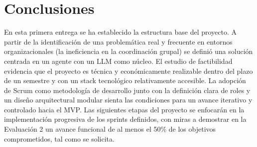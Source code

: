 \section{Conclusiones}

En esta primera entrega se ha establecido la estructura base del proyecto. A partir de la identificación de una problemática real y frecuente en entornos organizacionales (la ineficiencia en la coordinación grupal) se definió una solución centrada en un agente con un LLM como núcleo. El estudio de factibilidad evidencia que el proyecto es técnica y económicamente realizable dentro del plazo de un semestre y con un stack tecnológico relativamente accesible. La adopción de Scrum como metodología de desarrollo junto con la definición clara de roles y un diseño arquitectural modular sienta las condiciones para un avance iterativo y controlado hacia el MVP. Las siguientes etapas del proyecto se enfocarán en la implementación progresiva de los sprints definidos, con miras a demostrar en la Evaluación 2 un avance funcional de al menos el 50\% de los objetivos comprometidos, tal como se solicita.
